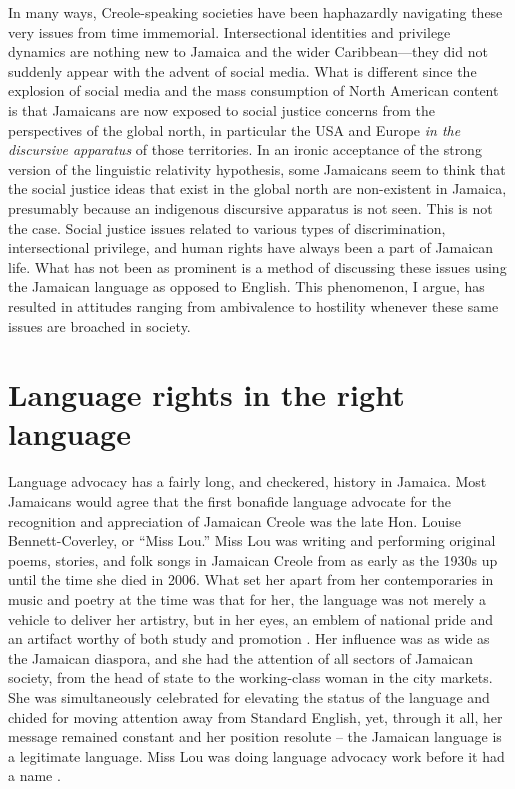 \documentclass[output=paper,colorlinks,citecolor=brown]{langscibook}
\begin{document}
In many ways, Creole-speaking societies have been haphazardly navigating these very issues from time immemorial. Intersectional identities and privilege dynamics are nothing new to Jamaica and the wider Caribbean—they did not suddenly appear with the advent of social media. What is different since the explosion of social media and the mass consumption of North American content is that Jamaicans are now exposed to social justice concerns from the perspectives of the global north, in particular the USA and Europe \emph{in the discursive apparatus} of those territories. In an ironic acceptance of the strong version of the linguistic relativity hypothesis, some Jamaicans seem to think that the social justice ideas that exist in the global north are non-existent in Jamaica, presumably because an indigenous discursive apparatus is not seen. This is not the case. Social justice issues related to various types of discrimination, intersectional privilege, and human rights have always been a part of Jamaican life. What has not been as prominent is a method of discussing these issues using the Jamaican language as opposed to English. This phenomenon, I argue, has resulted in attitudes ranging from ambivalence to hostility whenever these same issues are broached in society. 


\section{Language rights in the right language}

Language advocacy has a fairly long, and checkered, history in Jamaica. Most Jamaicans would agree that the first bonafide language advocate for the recognition and appreciation of Jamaican Creole was the late Hon. Louise Bennett-Coverley, or “Miss Lou.” Miss Lou was writing and performing original poems, stories, and folk songs in Jamaican Creole from as early as the 1930s up until the time she died in 2006. What set her apart from her contemporaries in music and poetry at the time was that for her, the language was not merely a vehicle to deliver her artistry, but in her eyes, an emblem of national pride and an artifact worthy of both study and promotion \citep{Morris2014}. Her influence was as wide as the Jamaican diaspora, and she had the attention of all sectors of Jamaican society, from the head of state to the working-class woman in the city markets. She was simultaneously celebrated for elevating the status of the language and chided for moving attention away from Standard English, yet, through it all, her message remained constant and her position resolute -- the Jamaican language is a legitimate language. Miss Lou was doing language advocacy work before it had a name \citep{Forrester2022}. 
\end{document}
